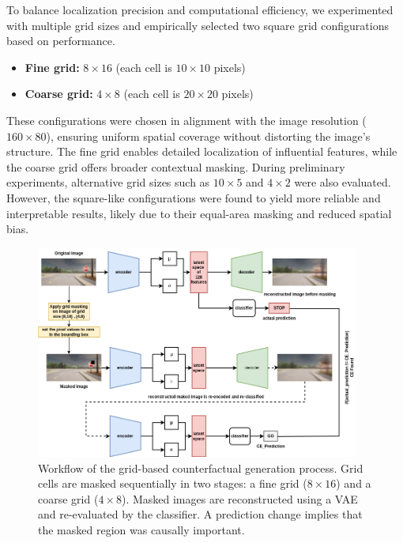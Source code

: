 To balance localization precision and computational efficiency, we experimented with multiple grid sizes and empirically selected two square grid configurations based on performance. 

\begin{itemize}
    \item \textbf{Fine grid:} $8 \times 16$ (each cell is $10 \times 10$ pixels)
    \item \textbf{Coarse grid:} $4 \times 8$ (each cell is $20 \times 20$ pixels)
\end{itemize}

These configurations were chosen in alignment with the image resolution ($160 \times 80$), ensuring uniform spatial coverage without distorting the image’s structure. The fine grid enables detailed localization of influential features, while the coarse grid offers broader contextual masking. During preliminary experiments, alternative grid sizes such as $10 \times 5$ and $4 \times 2$ were also evaluated. However, the square-like configurations were found to yield more reliable and interpretable results, likely due to their equal-area masking and reduced spatial bias.

\begin{figure}[htbp]
\centering
\includegraphics[width=0.95\textwidth]{img/masking/grid_based_masking/grid_based_masking_flow.drawio.png}
\caption{
Workflow of the grid-based counterfactual generation process. Grid cells are masked sequentially in two stages: a fine grid ($8 \times 16$) and a coarse grid ($4 \times 8$). Masked images are reconstructed using a VAE and re-evaluated by the classifier. A prediction change implies that the masked region was causally important.
}
\label{fig:grid_masking_diagram}
\end{figure}

